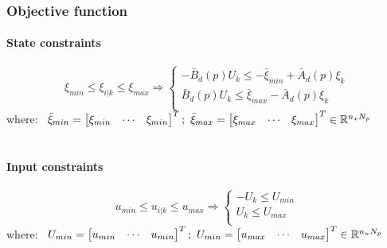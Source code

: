 \documentclass[12pt]{article}
\begin{document}
                

        \subsubsection{Objective function}
            \paragraph{State constraints}
            \begin{equation}
                \xi_{min} \leq \xi_{i|k} \leq \xi_{max}
                \Rightarrow
                \begin{cases}
                    -\bar{B}_d(p) U_k \leq -\bar{\xi}_{min} + \bar{A}_d(p) \xi_{k} \\
                    \bar{B}_d(p) U_k \leq \bar{\xi}_{max} - \bar{A}_d(p) \xi_{k} \\
                \end{cases}
            \end{equation}
            where:  $ \begin{array}[t]{l}
                        \bar{\xi}_{min} = \begin{bmatrix} \xi_{min} & \cdots & \xi_{min} \end{bmatrix}^T;\
                        \bar{\xi}_{max} = \begin{bmatrix} \xi_{max} & \cdots & \xi_{max} \end{bmatrix}^T
                        \in \mathbb{R}^{n_x N_p}
                    \end{array} $ \\
            \\

            \paragraph{Input constraints}
            \begin{equation}
                u_{min} \leq u_{i|k} \leq u_{max}
                \Rightarrow
                \begin{cases}
                    -U_k \leq U_{min} \\
                    U_k \leq U_{max} \\
                \end{cases}
            \end{equation}
            where:  $ \begin{array}[t]{l}
                        U_{min} = \begin{bmatrix} u_{min} & \cdots & u_{min} \end{bmatrix}^T;\
                        U_{min} = \begin{bmatrix} u_{max} & \cdots & u_{max} \end{bmatrix}^T
                        \in \mathbb{R}^{n_u N_p}
                    \end{array} $ \\
            \\
\end{document}
